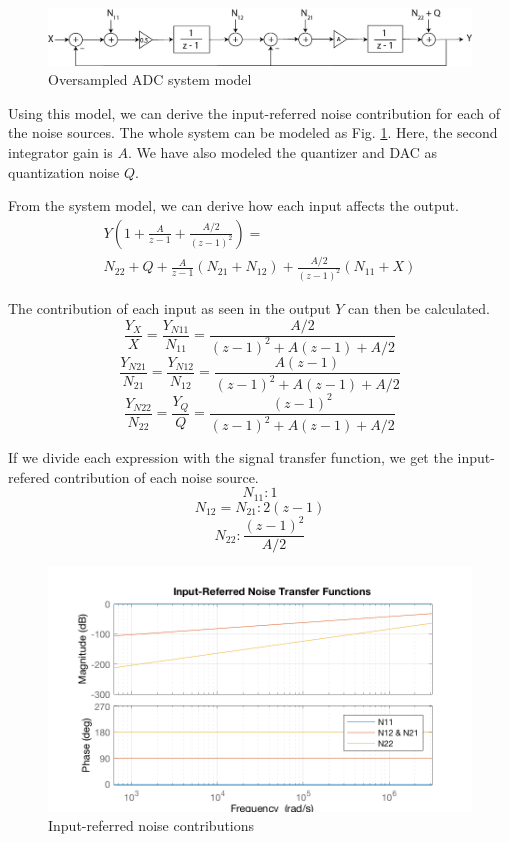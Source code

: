 \documentclass[conference]{IEEEtran}
\begin{document}
\begin{figure}[!b]
\centering
\includegraphics[width=\textwidth]{img/system}
\caption{Oversampled ADC system model}
\label{system-model}
\end{figure}


Using this model, we can derive the input-referred noise contribution for each of the noise sources. The whole system can be modeled as Fig. \ref{system-model}. Here, the second integrator gain is $A$. We have also modeled the quantizer and DAC as quantization noise $Q$.

From the system model, we can derive how each input affects the output.
\begin{multline}
Y \left( 1 + \frac{A}{z-1} + \frac{A/2}{(z-1)^2}\right) = \\ N_{22} + Q + \frac{A}{z-1}(N_{21}+N_{12}) + \frac{A/2}{(z-1)^2}(N_{11}+X)
\end{multline}

The contribution of each input as seen in the output $Y$ can then be calculated.
$$\frac{Y_X}{X} = \frac{Y_{N11}}{N_{11}} = \frac{A/2}{(z-1)^2+A(z-1)+A/2}$$
$$\frac{Y_{N21}}{N_{21}} = \frac{Y_{N12}}{N_{12}} = \frac{A(z-1)}{(z-1)^2+A(z-1)+A/2}$$
$$\frac{Y_{N22}}{N_{22}} = \frac{Y_Q}{Q} = \frac{(z-1)^2}{(z-1)^2+A(z-1)+A/2}$$

If we divide each expression with the signal transfer function, we get the input-refered contribution of each noise source.
$$N_{11}: 1$$
$$N_{12} = N_{21}: 2(z-1)$$
$$N_{22}: \frac{(z-1)^2}{A/2}$$

\begin{figure}[h]
\centering
\includegraphics[width=\linewidth]{input-referred-bode}
\caption{Input-referred noise contributions}
\label{noise-tf}
\end{figure}
\end{document}
